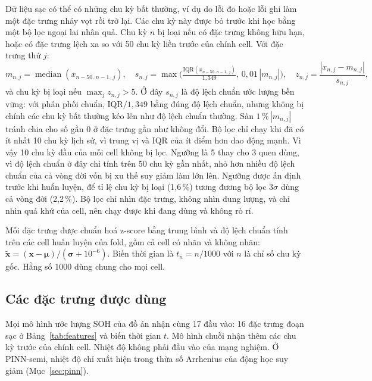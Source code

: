 Dữ liệu sạc có thể có những chu kỳ bất thường, ví dụ do lỗi đo hoặc lỗi ghi làm một đặc trưng nhảy vọt rồi trở lại. Các
chu kỳ này được bỏ trước khi học bằng một bộ lọc ngoại lai nhân quả. Chu kỳ $n$ bị loại nếu có đặc trưng không hữu hạn,
hoặc có đặc trưng lệch xa so với 50 chu kỳ liền trước của chính cell. Với đặc trưng thứ $j$:
\begin{equation}
m_{n,j} = \operatorname{median}(x_{n-50..n-1,\,j}), \quad
s_{n,j} = \max\!\Big(\tfrac{\mathrm{IQR}(x_{n-50..n-1,\,j})}{1{,}349},\, 0{,}01\,|m_{n,j}|\Big), \quad
z_{n,j} = \frac{|x_{n,j} - m_{n,j}|}{s_{n,j}},
\end{equation}
và chu kỳ bị loại nếu $\max_j z_{n,j} > 5$. Ở đây $s_{n,j}$ là độ lệch chuẩn ước lượng bền vững: với phân phối chuẩn,
IQR$/1{,}349$ bằng đúng độ lệch chuẩn, nhưng không bị chính các chu kỳ bất thường kéo lên như độ lệch chuẩn thường. Sàn
$1\,\%\,|m_{n,j}|$ tránh chia cho số gần 0 ở đặc trưng gần như không đổi. Bộ lọc chỉ chạy khi đã có ít nhất 10 chu kỳ
lịch sử, vì trung vị và IQR của ít điểm hơn dao động mạnh. Vì vậy 10 chu kỳ đầu của mỗi cell không bị lọc. Ngưỡng là 5
thay cho 3 quen dùng, vì độ lệch chuẩn ở đây chỉ tính trên 50 chu kỳ gần nhất, nhỏ hơn nhiều độ lệch chuẩn của cả vòng
đời vốn bị xu thế suy giảm làm lớn lên. Ngưỡng được ấn định trước khi huấn luyện, để tỉ lệ chu kỳ bị loại (1{,}6\,\%)
tương đương bộ lọc $3\sigma$ dùng cả vòng đời (2{,}2\,\%). Bộ lọc chỉ nhìn đặc trưng, không nhìn dung lượng, và chỉ nhìn
quá khứ của cell, nên chạy được khi đang dùng và không rò rỉ. 

Mỗi đặc trưng được chuẩn hoá z-score bằng trung bình và độ lệch chuẩn tính trên các cell huấn luyện của fold, gồm cả cell
có nhãn và không nhãn: $\tilde{\mathbf{x}} = (\mathbf{x} - \boldsymbol\mu)/(\boldsymbol\sigma + 10^{-6})$. Biến thời gian
là $t_n = n/1000$ với $n$ là chỉ số chu kỳ gốc. Hằng số 1000 dùng chung cho mọi cell.

\subsection{Các đặc trưng được dùng}\label{sec:dt_dung}

Mọi mô hình ước lượng SOH của đồ án nhận cùng 17 đầu vào: 16 đặc trưng đoạn sạc ở Bảng~\ref{tab:features} và biến thời
gian $t$. Mô hình chuỗi nhận thêm các chu kỳ trước của chính cell. Nhiệt độ không phải đầu vào của mạng nghiệm. Ở
PINN-semi, nhiệt độ chỉ xuất hiện trong thừa số Arrhenius của động học suy giảm (Mục~\ref{sec:pinn}).

